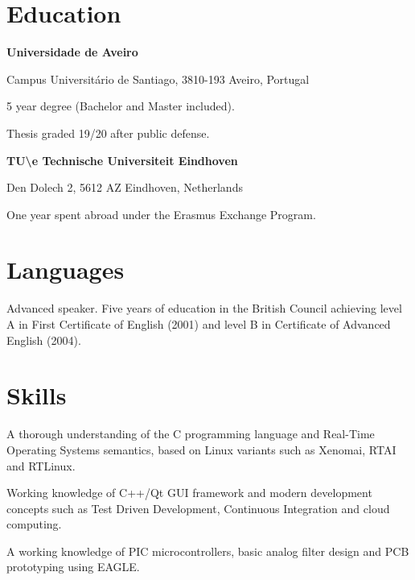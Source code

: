 \section*{Education}

{
\textbf{Universidade de Aveiro}

Campus Universitário de Santiago, 3810-193 Aveiro, Portugal
}
{
5 year degree (Bachelor and Master included).

Thesis graded 19/20 after public defense. 
}

\vspace{\baselineskip}

{
\textbf{TU\textbackslash e Technische Universiteit Eindhoven}

Den Dolech 2, 5612 AZ Eindhoven, Netherlands
}
{
One year spent abroad under the Erasmus Exchange Program.
}

\section*{Languages}

{
Advanced speaker. Five years of education in the British Council achieving
level A in First Certificate of English (2001) and level B in Certificate of
Advanced English (2004).
}


\section*{Skills}

{

A thorough understanding of the C programming language and Real-Time Operating
Systems semantics, based on Linux variants such as Xenomai, RTAI and RTLinux.

Working knowledge of C++/Qt GUI framework and modern development concepts such
as Test Driven Development, Continuous Integration and cloud computing.

}
{
A working knowledge of PIC microcontrollers, basic analog filter design and PCB prototyping using EAGLE.
}

